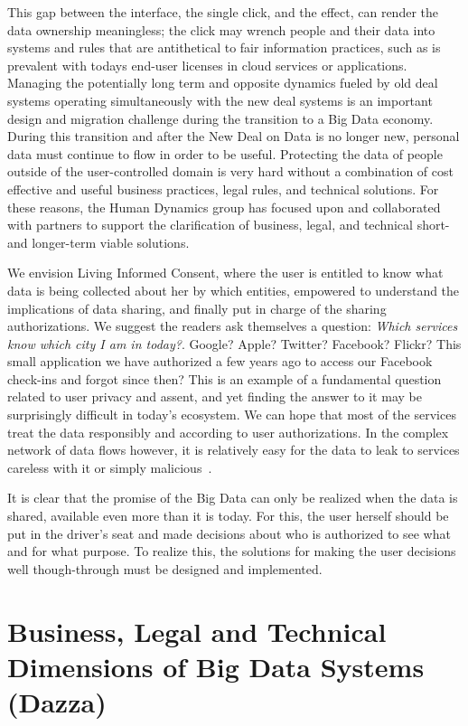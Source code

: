 This gap between the interface, the single click, and the effect, can render the data ownership meaningless; the click may wrench people and their data into systems and rules that are antithetical to fair information practices, such as is prevalent with todays end-user licenses in cloud services or applications.
Managing the potentially long term and opposite dynamics fueled by old deal systems operating simultaneously with the new deal systems is an important design and migration challenge during the transition to a Big Data economy.
During this transition and after the New Deal on Data is no longer new, personal data must continue to flow in order to be useful.
Protecting the data of people outside of the user-controlled domain is very hard without a combination of cost effective and useful business practices, legal rules, and technical solutions.
For these reasons, the Human Dynamics group has focused upon and collaborated with partners to support the clarification of business, legal, and technical short- and longer-term viable solutions.

We envision Living Informed Consent, where the user is entitled to know what data is being collected about her by which entities, empowered to understand the implications of data sharing, and finally put in charge of the sharing authorizations.
We suggest the readers ask themselves a question: \emph{Which services know which city I am in today?}.
Google? Apple? Twitter? Facebook? Flickr?
This small application we have authorized a few years ago to access our Facebook check-ins and forgot since then? 
This is an example of a fundamental question related to user privacy and assent, and yet finding the answer to it may be surprisingly difficult in today's ecosystem.
We can hope that most of the services treat the data responsibly and according to user authorizations.
In the complex network of data flows however, it is relatively easy for the data to leak to services careless with it or simply malicious~\cite{biltongirls}.

It is clear that the promise of the Big Data can only be realized when the data is shared, available even more than it is today.
For this, the user herself should be put in the driver's seat and made decisions about who is authorized to see what and for what purpose.
To realize this, the solutions for making the user decisions well though-through must be designed and implemented.



\section{Business, Legal and Technical Dimensions of Big Data Systems (Dazza)}

